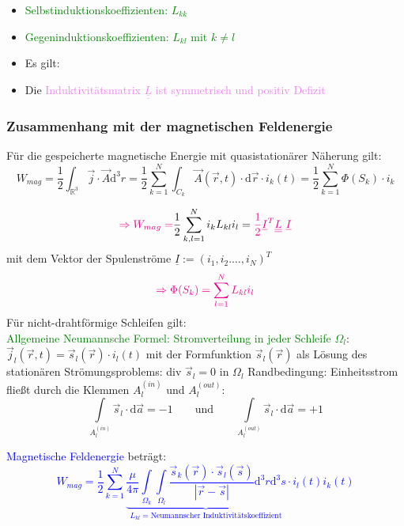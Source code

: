 \documentclass[]{article}
\newcommand{\R}{\ensuremath{\mathbb R}}
\newcommand{\dd}{\ensuremath{\text{d}}}
\begin{document}
	\begin{itemize}
		\item 
			\textcolor{green}{Selbstinduktionskoeffizienten: $L_{kk}$}
		\item 	
			\textcolor{Green}{Gegeninduktionskoeffizienten: $L_{kl}$ mit $k\not= l$	}
		\item 
			Es gilt: 
		\item 
			Die \textcolor{violet}{Induktivitätsmatrix $\underline{\underline{L}}$ ist symmetrisch und positiv Defizit }
	\end{itemize}
	
\subsubsection{Zusammenhang mit der magnetischen Feldenergie}
	Für die gespeicherte magnetische Energie mit quasistationärer Näherung gilt: $$W_{mag}=\frac{1}{2}\int_{\R^3}\vec{j}\cdot \vec{A}\dd^3r=\frac{1}{2}\sum\limits_{k=1}^N\int_{C_k} \vec{A}(\vec{r},t)\cdot \dd\vec{r}\cdot i_k(t)=\frac{1}{2}\sum\limits_{k=1}^N\Phi(S_k)\cdot i_k$$
	
\newpage
	
	$$\textcolor{magenta}{\Rightarrow W_{mag}=}\frac{1}{2}\sum\limits_{k,l=1}^{N}i_kL_{kl}i_l=\textcolor{magenta}{\frac{1}{2}\underline{I}^T\underline{\underline{L}}\ \underline{I}}$$ mit dem Vektor der Spulenströme $\underline{I}:=(i_1,i_2.\dots,i_N)^T$
	$$\textcolor{magenta}{\Rightarrow \Phi(S_k)= \sum\limits_{l=1}^{N}L_{kl}i_l}$$
	Für nicht-drahtförmige Schleifen gilt: 
	 
	\\\textcolor{green}{Allgemeine Neumannsche Formel: 
	Stromverteilung in jeder Schleife $\Omega_l$}: $\vec{j}_l(\vec{r},t)=\vec{s}_l(\vec{r})\cdot i_l(t)$ mit der Formfunktion $\vec{s}_l(\vec{r})$ als Lösung des stationären Strömungsproblems: div $\vec{s}_l=0$ in $\Omega_l$
	Randbedingung: Einheitsstrom fließt durch die Klemmen $A_l^{(in)} $ und $A_l^{(out)} $:
	$$\int\limits_{A_l^{(in)}} \vec{s}_l\cdot \dd \vec{a}=-1 \qquad \text{und}\qquad  \int\limits_{A_l^{(out)}} \vec{s}_l\cdot \dd \vec{a}=+1$$
	
\newpage	
	
	\textcolor{blue}{Magnetische Feldenergie} beträgt: 
	\textcolor{blue}{$$W_{mag}=\frac{1}{2}\sum\limits_{k=1}^{N}\underbrace{\frac{\mu}{4\pi}\int\limits_{\Omega_k}\int\limits_{\Omega_l}\frac{\vec{s}_k(\vec{r})\cdot \vec{s}_l(\vec{s})}{|\vec{r}-\vec{s}|}\dd^3 r\dd^3 s}_{L_{kl}=\text{Neumannscher Induktivitätskoeffizient}}\cdot i_l(t)i_k(t)$$}
\end{document}
